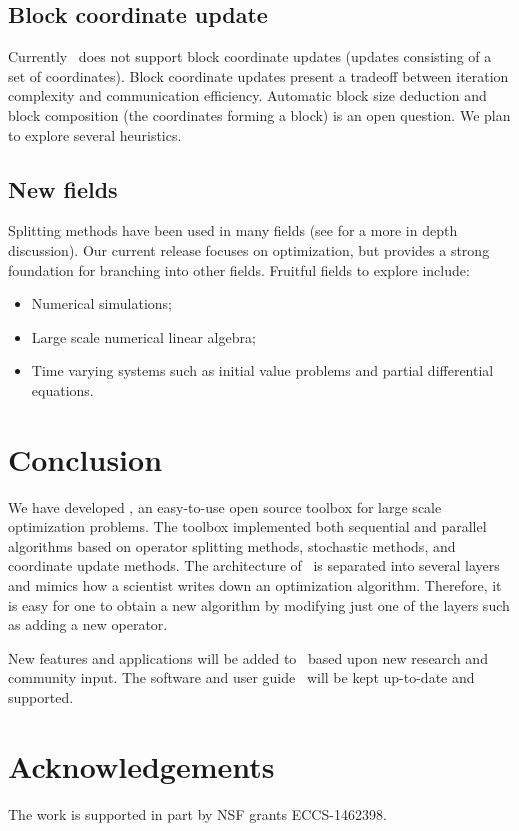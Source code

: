 \subsection{Block coordinate update}
  Currently \pkg~does not support block coordinate updates (updates consisting of a set of coordinates). Block coordinate updates present a tradeoff between iteration complexity and communication efficiency.
  Automatic block size deduction and block composition (the coordinates forming a block) is an open question.
We plan to explore several heuristics.

\subsection{New fields}

Splitting methods have been used in many fields (see \citep{roland2016some} for a more in depth discussion).
Our current release focuses on optimization, but provides a strong foundation for branching into other fields.
Fruitful fields to explore include:

\begin{itemize}
\item Numerical simulations;
\item Large scale numerical linear algebra;
\item Time varying systems such as initial value problems and partial differential equations.
\end{itemize}


\section{Conclusion }
We have developed \pkg, an easy-to-use open source toolbox for large scale optimization problems.
The toolbox implemented both sequential and parallel algorithms based on operator splitting methods, stochastic methods,
and coordinate update methods. The architecture of \pkg~is separated into several layers and mimics how a scientist writes down an optimization algorithm. Therefore, it is easy for one to obtain a new algorithm by modifying just one of the layers such as adding a new operator.


New features and applications will be added to \pkg~based upon new research and community input. The software and user guide \repo~will be kept up-to-date and supported.

\section{Acknowledgements}
The work is supported in part by NSF grants ECCS-1462398.